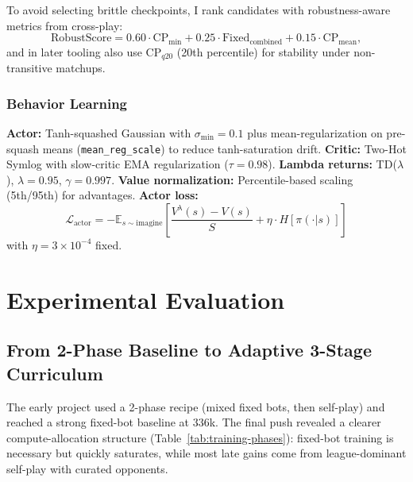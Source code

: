 \documentclass[11pt]{article}
\begin{document}
To avoid selecting brittle checkpoints, I rank candidates with robustness-aware metrics from cross-play:
\[
\text{RobustScore}=0.60\cdot \text{CP}_{\min}+0.25\cdot \text{Fixed}_{\text{combined}}+0.15\cdot \text{CP}_{\text{mean}},
\]
and in later tooling also use $\text{CP}_{q20}$ (20th percentile) for stability under non-transitive matchups.

\subsubsection{Behavior Learning}

\textbf{Actor:} Tanh-squashed Gaussian with $\sigma_{\min} = 0.1$ plus mean-regularization on pre-squash means (\texttt{mean\_reg\_scale}) to reduce tanh-saturation drift. \textbf{Critic:} Two-Hot Symlog with slow-critic EMA regularization ($\tau = 0.98$). \textbf{Lambda returns:} TD($\lambda$), $\lambda = 0.95$, $\gamma = 0.997$. \textbf{Value normalization:} Percentile-based scaling (5th/95th) for advantages. \textbf{Actor loss:}
\begin{equation}
\mathcal{L}_\text{actor} = -\mathbb{E}_{s \sim \text{imagine}} \left[ \frac{V^\lambda(s) - V(s)}{S} + \eta \cdot H[\pi(\cdot|s)] \right]
\end{equation}
with $\eta = 3 \times 10^{-4}$ fixed.

\section{Experimental Evaluation}\label{sec:experiments}

\subsection{From 2-Phase Baseline to Adaptive 3-Stage Curriculum}

The early project used a 2-phase recipe (mixed fixed bots, then self-play) and reached a strong fixed-bot baseline at 336k. The final push revealed a clearer compute-allocation structure (Table~\ref{tab:training-phases}): fixed-bot training is necessary but quickly saturates, while most late gains come from league-dominant self-play with curated opponents.
\end{document}
